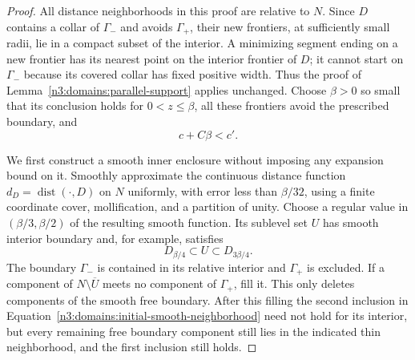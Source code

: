 \begin{proof}
All distance neighborhoods in this proof are relative to $N$.
Since $D$ contains a collar of $\Gamma_-$ and avoids $\Gamma_+$,
their new frontiers, at sufficiently small radii, lie in a compact
subset of the interior.  A minimizing segment ending on a new
frontier has its nearest point on the interior frontier of $D$;
it cannot start on $\Gamma_-$ because its covered collar has fixed
positive width.  Thus the proof of
Lemma~\ref{n3:domains:parallel-support} applies unchanged.  Choose
$\beta>0$ so small that its conclusion holds for $0<z\leq\beta$,
all these frontiers avoid the prescribed boundary, and
\begin{equation}\label{n3:domains:band-gap}
 c+C\beta<c'.
\end{equation}

We first construct a smooth inner enclosure without imposing any
expansion bound on it.  Smoothly approximate the continuous distance
function $d_D=\operatorname{dist}(\cdot,D)$ on $N$ uniformly, with
error less than $\beta/32$, using a finite coordinate cover,
mollification, and a partition of unity.  Choose a regular value in
$(\beta/3,\beta/2)$ of the resulting smooth function.  Its sublevel
set $U$ has smooth interior boundary and, for example, satisfies
\begin{equation}\label{n3:domains:initial-smooth-neighborhood}
 D_{\beta/4}\subset U\subset D_{3\beta/4}.
\end{equation}
The boundary $\Gamma_-$ is contained in its relative interior and
$\Gamma_+$ is excluded.  If a component of $N\setminus\overline U$
meets no component of $\Gamma_+$, fill it.  This only deletes
components of the smooth free boundary.  After this filling the
second inclusion in
Equation~\eqref{n3:domains:initial-smooth-neighborhood} need not hold
for its interior, but every remaining free boundary component still
lies in the indicated thin neighborhood, and the first inclusion
still holds.


\end{proof}
